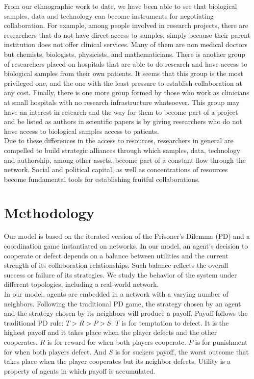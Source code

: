 \documentclass{bmcart}
\begin{document}
From our ethnographic work to date, we have been able to see that
biological samples, data and technology can become instruments for negotiating
collaboration. For example, among people involved in research projects, there
are researchers that do not have direct access to samples, simply because their
parent institution does not offer clinical services. Many of them are non medical
doctors but chemists, biologists, physicists, and mathematicians. There is
another group of researchers placed on hospitals that are able to do
research and have access to biological samples from their own patients. It seems
that this group is the most privileged one, and the one with the least pressure to establish
collaboration at any cost. Finally, there is one more group formed by those
who work as clinicians at small hospitals with no research infrastructure
whatsoever. This group may have an interest in research and the way for them to
become part of a project and be listed as authors in scientific papers is by
giving researchers who do not have access to biological samples access to
patients.\\

Due to these differences in the access to resources, researchers in
general are compelled to build strategic alliances through which samples, data,
technology and authorship, among other assets, become part of a constant flow through
the network. Social and political capital, as well as concentrations of
resources become fundamental tools for establishing fruitful collaborations. 

\section*{Methodology}

Our model is based on the iterated version of the Prisoner's Dilemma (PD) and a
coordination game instantiated on networks. In our model, an agent's decision to
cooperate or defect depends on a balance between utilities and the current
strength of its collaboration relationships. Such balance reflects the overall
success or failure of its strategies. We study the behavior of the system under
different topologies, including a real-world network.\\

In our model, agents are embedded in a network with a varying number of
neighbors. Following the traditional PD game, the strategy chosen by an agent
and the strategy chosen by its neighbors will produce a payoff. Payoff follows
the traditional PD rule: $T > R > P > S$. $T$ is for temptation to defect. It is the highest
payoff and it takes place when the player defects and the other cooperates. $R$
is for reward for when both players cooperate. $P$ is for punishment for when
both players defect. And $S$ is for suckers payoff, the worst outcome that
takes place when the player cooperates but its neighbor defects. Utility is a
property of agents in which payoff is accumulated.\\   
\end{document}
